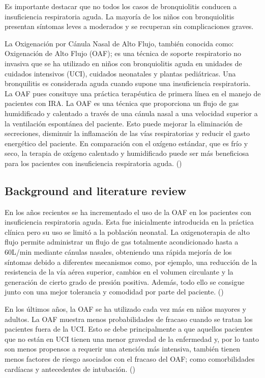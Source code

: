 Es importante destacar que no todos los casos de bronquiolitis conducen a insuficiencia respiratoria aguda. La mayoría de los niños con bronquiolitis presentan síntomas leves a moderados y se recuperan sin complicaciones graves. 

La Oxigenación por Cánula Nasal de Alto Flujo, también conocida como: Oxigenación de Alto Flujo (OAF); es una técnica de soporte respiratorio no invasiva que se ha utilizado en niños con bronquiolitis aguda en unidades de cuidados intensivos (UCI), cuidados neonatales y plantas pediátricas. Una bronquilitis es considerada aguda cuando supone una insuficiencia respiratoria. La OAF pues consituye una práctica terapéutica de primera línea en el manejo de pacientes con IRA. La OAF es una técnica que proporciona un flujo de gas humidificado y calentado a través de una cánula nasal a una velocidad superior a la ventilación espontánea del paciente. Esto puede mejorar la eliminación de secreciones, disminuir la inflamación de las vías respiratorias y reducir el gasto energético del paciente. En comparación con el oxígeno estándar, que es frío y seco, la terapia de oxígeno calentado y humidificado puede ser más beneficiosa para los pacientes con insuficiencia respiratoria aguda. (\cite{Daverio2019})


\subsection{Background and literature review}

En los años recientes se ha incrementado el uso de la OAF en los pacientes con insuficiencia respiratoria aguda. Esta fue inicialmente introducida en la práctica clínica pero su uso se limitó a la población neonatal. La oxigenoterapia de alto flujo permite administrar un flujo de gas totalmente acondicionado hasta a 60L/min mediante cánulas nasales, obteniendo una rápida mejoría de los síntomas debido a diferentes mecanismos como, por ejemplo, una reducción de la resistencia de la vía aérea superior, cambios en el volumen circulante y la generación de cierto grado de presión positiva. Además, todo ello se consigue junto con una mejor tolerancia y comodidad por parte del paciente. (\cite{Masclans2015})

En los últimos años, la OAF se ha utilizado cada vez más en niños mayores y adultos. La OAF muestra menos probabilidades de fracaso cuando se tratan los pacientes fuera de la UCI. Esto se debe principalmente a que aquellos pacientes que no están en UCI tienen una menor gravedad de la enfermedad y, por lo tanto son menos propensos a requerir una atención más intensiva, también tienen menos factores de riesgo asociados con el fracaso del OAF; como comorbilidades cardíacas y antecedentes de intubación. (\cite{Betters2017}) 

